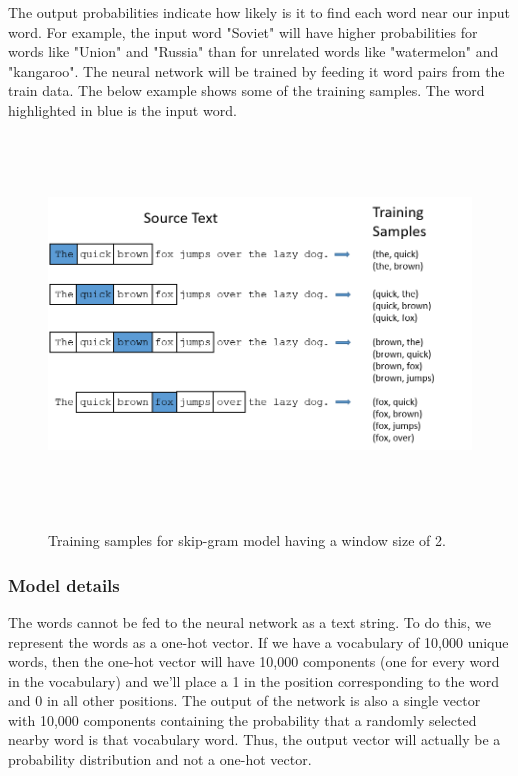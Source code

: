 The output probabilities indicate how likely is it to find each word near our input word. For example, the input word "Soviet" will have higher probabilities for words like "Union" and "Russia" than for unrelated words like "watermelon" and "kangaroo". The neural network will be trained by feeding it word pairs from the train data. The below example shows some of the training samples. The word highlighted in blue is the input word.

\begin{figure}[htbp]
\centering
\includegraphics[width=16cm, height=10cm]{images/training_data.png}\\
\centering
\caption{Training samples for skip-gram model having a window size of 2.}
\label{fig:foo}
\end{figure}

\subsubsection{Model details}

The words cannot be fed to the neural network as a text string. To do this, we represent the words as a one-hot vector. If we have a vocabulary of 10,000 unique words, then the one-hot vector will have 10,000 components (one for every word in the vocabulary) and we'll place a 1 in the position corresponding to the word and 0 in all other positions. The output of the network is also a single vector with 10,000 components containing the probability that a randomly selected nearby word is that vocabulary word. Thus, the output vector will actually be a probability distribution and not a one-hot vector.

